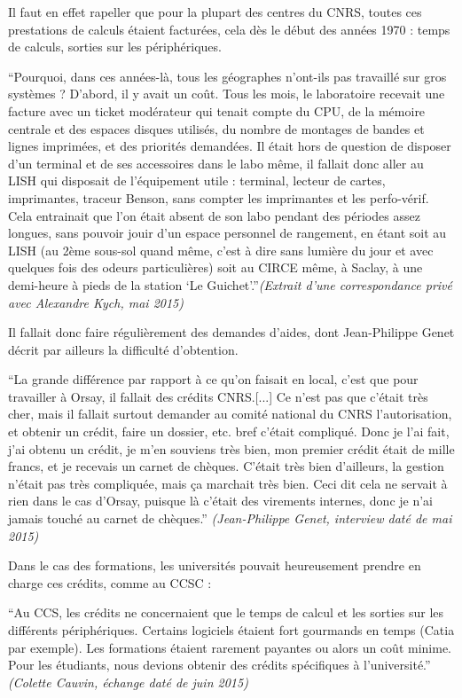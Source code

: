 Il faut en effet rapeller que pour la plupart des centres du CNRS, toutes ces prestations de calculs étaient facturées, cela dès le début des années 1970 : temps de calculs, sorties sur les périphériques.

\enquote{Pourquoi, dans ces années-là, tous les géographes n'ont-ils pas travaillé sur gros systèmes ? D'abord, il y avait un coût. Tous les mois, le laboratoire recevait une facture avec un ticket modérateur qui tenait compte du CPU, de la mémoire centrale et des espaces disques utilisés, du nombre de montages de bandes et lignes imprimées, et des priorités demandées. Il était hors de question de disposer d'un terminal et de ses accessoires dans le labo même, il fallait donc aller au LISH qui disposait de l'équipement utile : terminal, lecteur de cartes, imprimantes, traceur Benson, sans compter les imprimantes et les perfo-vérif. Cela entrainait que l'on était absent de son labo pendant des périodes assez longues, sans pouvoir jouir d'un espace personnel de rangement, en étant soit au LISH (au 2ème sous-sol quand même, c'est à dire sans lumière du jour et avec quelques fois des odeurs particulières) soit au CIRCE même, à Saclay, à une demi-heure à pieds de la station \enquote{Le Guichet}.}\textit{(Extrait d'une correspondance privé avec Alexandre Kych, mai 2015)}

Il fallait donc faire régulièrement des demandes d'aides, dont Jean-Philippe Genet décrit par ailleurs la difficulté d'obtention.

\enquote{La grande différence par rapport à ce qu'on faisait en local, c'est que pour travailler à Orsay, il fallait des crédits CNRS.[...] Ce n’est pas que c'était très cher, mais il fallait surtout demander au comité national du CNRS l'autorisation, et obtenir un crédit, faire un dossier, etc. bref c'était compliqué. Donc je l'ai fait, j'ai obtenu un crédit, je m'en souviens très bien, mon premier crédit était de mille francs, et je recevais un carnet de chèques. C'était très bien d'ailleurs, la gestion n'était pas très compliquée, mais ça marchait très bien. Ceci dit cela ne servait à rien dans le cas d'Orsay, puisque là c'était des virements internes, donc je n’ai jamais touché au carnet de chèques.} \textit{(Jean-Philippe Genet, interview daté de mai 2015)}

Dans le cas des formations, les universités pouvait heureusement prendre en charge ces crédits, comme au CCSC : 

\enquote{Au CCS, les crédits ne concernaient que le temps de calcul et les sorties sur les différents périphériques. Certains logiciels étaient fort gourmands en temps (Catia par exemple). Les formations étaient rarement payantes ou alors un coût minime. Pour les étudiants, nous devions obtenir des crédits spécifiques à l’université.} \textit{(Colette Cauvin, échange daté de juin  2015)}

